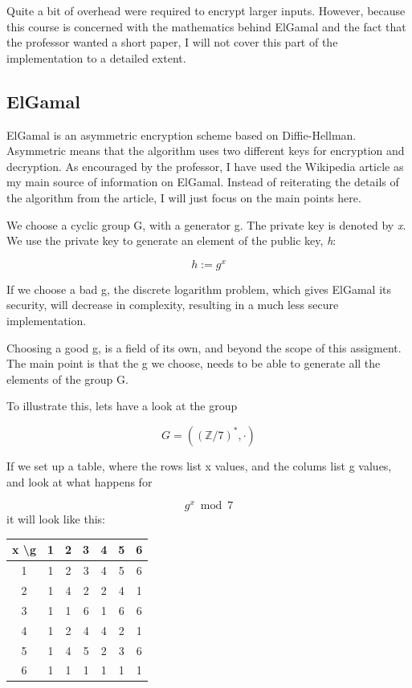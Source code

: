 \documentclass{article}
\begin{document}
Quite a bit of overhead were required to encrypt larger inputs. However, because this course is concerned with the mathematics behind ElGamal and the fact that the professor wanted a short paper, I will not cover this part of the implementation to a detailed extent.

\subsection{ElGamal}
ElGamal is an asymmetric encryption scheme based on Diffie-Hellman. Asymmetric means that the algorithm uses two different keys for encryption and decryption. As encouraged by the professor, I have used the Wikipedia article\cite{WIKI} as my main source of information on ElGamal. Instead of reiterating the details of the algorithm from the article, I will just focus on the main points here.

We choose a cyclic group G, with a generator g. The private key is denoted by \textit{x}. We use the private key to generate an element of the public key, \textit{h}:

\begin{equation*}
h := g^{x}
\end{equation*}

If we choose a bad g, the discrete logarithm problem, which gives ElGamal its security, will decrease in complexity, resulting in a much less secure implementation.

Choosing a good g, is a field of its own, and beyond the scope of this assigment. The main point is that the g we choose, needs to be able to generate all the elements of the group G.

To illustrate this, lets have a look at the group

\begin{equation*}
  G =((\mathbb{Z}/7)^{*}, \cdot)
\end{equation*}


If we set up a table, where the rows list x values, and the colums list g values, and look at what happens for

\begin{equation*}
  g^{x} \bmod 7
\end{equation*}
it will look like this:

\begin{center}
 \begin{tabular}{||c|c c c c c c||}
 \hline
   x \textbackslash g & 1 & 2 & \textbf{3} & 4 & \textbf{5} & 6\\ [0.5ex]
 \hline
   1 & 1 & 2 & 3 & 4 & 5 & 6 \\
 \hline
   2 & 1 & 4 & 2 & 2 & 4 & 1 \\
 \hline
   3 & 1 & 1 & 6 & 1 & 6 & 6 \\
 \hline
   4 & 1 & 2 & 4 & 4 & 2 & 1 \\
 \hline
   5 & 1 & 4 & 5 & 2 & 3 & 6 \\
 \hline
   6 & 1 & 1 & 1 & 1 & 1 & 1 \\ [1ex]
 \hline
\end{tabular}
\end{center}
\end{document}
